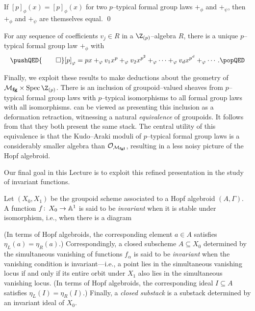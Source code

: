 \begin{corollary}\label{PSeriesDetermines}
If $[p]_\phi(x) = [p]_\phi(x)$ for two $p$--typical formal group laws $+_\phi$ and $+_\psi$, then $+_\phi$ and $+_\psi$ are themselves equal. \qed
\end{corollary}

\begin{corollary}\label{EveryPSeriesArises}
For any sequence of coefficients $v_j \in R$ in a $\Z_{(p)}$--algebra $R$, there is a unique $p$--typical formal group law $+_\phi$ with
\[\pushQED{\qed}
[p]_\phi = px +_\phi v_1 x^p +_\phi v_2 x^{p^2} +_\phi \cdots +_\phi v_d x^{p^d} +_\phi \cdots. \qedhere
\popQED\]
\end{corollary}

Finally, we exploit these results to make deductions about the geometry of $\moduli{fg} \times \Spec \Z_{(p)}$.  There is an inclusion of groupoid--valued sheaves from $p$--typical formal group laws with $p$--typical isomorphisms to all formal group laws with all isomorphisms.   can be viewed as presenting this inclusion as a deformation retraction, witnessing a natural \emph{equivalence} of groupoids.  It follows from  that they both present the same stack.  The central utility of this equivalence is that the Kudo--Araki moduli of $p$--typical formal group laws is a considerably smaller algebra than $\mathcal{O}_{\mathcal{M}_{\mathbf{fgl}}}$, resulting in a less noisy picture of the Hopf algebroid.

Our final goal in this Lecture is to exploit this refined presentation in the study of invariant functions.
\begin{definition}\label{DefnClosedSubstack}
Let $(X_0, X_1)$ be the groupoid scheme associated to a Hopf algebroid $(A, \Gamma)$.  A function $f\colon\thinspace X_0 \to \mathbb A^1$ is said to be \textit{invariant} when it is stable under isomorphism, i.e., when there is a diagram
\begin{center}
\end{center}
(In terms of Hopf algebroids, the corresponding element $a \in A$ satisfies $\eta_L(a) = \eta_R(a)$.)  Correspondingly, a closed subscheme $A \subseteq X_0$ determined by the simultaneous vanishing of functions $f_\alpha$ is said to be \textit{invariant} when the vanishing condition is invariant---i.e., a point lies in the simultaneous vanishing locus if and only if its entire orbit under $X_1$ also lies in the simultaneous vanishing locus.  (In terms of Hopf algebroids, the corresponding ideal $I \subseteq A$ satisfies $\eta_L(I) = \eta_R(I)$.)  Finally, a \textit{closed substack} is a substack determined by an invariant ideal of $X_0$.
\end{definition}

